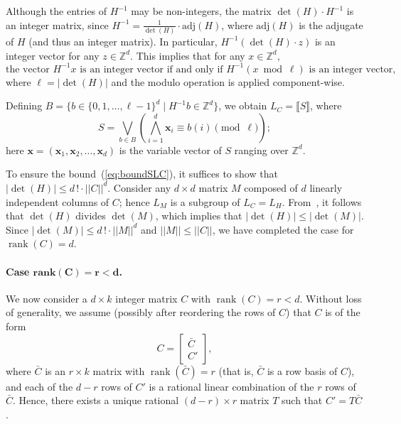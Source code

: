 \documentclass[11pt,a4paper]{amsart}
\newcommand{\adj}{\text{adj}}
\newcommand{\bvar}[1]{\mathbf{#1}}
\newcommand{\nnorm}[1]{||#1||}
\newcommand{\Zset}{\mathbb{Z}}
\newcommand{\setZ}{\Zset}
\newcommand{\rank}[1]{\operatorname{rank}(#1)}
\newcommand{\sem}[1]{\llbracket#1\rrbracket}
\theoremstyle{plain}
\theoremstyle{definition}
\theoremstyle{defC}
\theoremstyle{thmC}
\begin{document}
Although the entries of $H^{-1}$ may be non-integers, the matrix
$\det(H) \cdot H^{-1}$ is an integer matrix, since $H^{-1} =
\frac{1}{\det(H)}\cdot \adj(H)$, where $\adj(H)$ is the adjugate of
$H$ (and thus an integer matrix). In particular, $H^{-1}(\det(H) \cdot
z)$ is an integer vector for any $z \in \setZ^d$. This implies that
for any $x \in \setZ^d$, 
\[
	\text{the vector } H^{-1}x \text{ is an integer vector if and
	only if } H^{-1}(x \bmod \ell) \text{ is an integer vector,}
\]
where $\ell = |\det(H)|$ and the modulo operation is applied component-wise.


Defining $B = \{b \in \{0, 1, \dots, \ell{-}1\}^d \mid H^{-1}b \in \mathbb{Z}^d\}$, we obtain $L_C = \sem{S}$, where 
\[
    S = \bigvee_{b \in B} \left( \bigwedge_{i=1}^d \bvar{x}_i \equiv
    b(i) \!\!\!\! \pmod \ell \right);
\]
here $\bvar{x} = (\bvar{x}_1,\bvar{x}_2, \dots, \bvar{x}_d)$ is the
variable vector of $S$ ranging over $\setZ^d$.

To ensure the bound~(\ref{eq:boundSLC}),
it suffices to show that $|\det(H)|\leq d\,!\cdot\nnorm{C}^d$.
Consider any $d\times d$ matrix $M$ composed of $d$
linearly independent columns of $C$; hence $L_M$ is a subgroup of
$L_C=L_H$.
From~\cite[Chapter 4]{schrijver1986theory}, it follows that $\det(H)$
divides $\det(M)$, which implies that $|\det(H)|\leq |\det(M)|$.
Since $|\det(M)|\leq d\,!\cdot\nnorm{M}^d$ and
$\nnorm{M}\leq \nnorm{C}$, we have completed the case for
$\rank{C}=d$.

\paragraph{Case $\bm{\text{rank}(C)=r<d}$.}
We now consider a $d \times k$ integer matrix $C$ with $\rank{C} = r < d$. Without loss of generality, we assume (possibly after reordering the rows of $C$) that $C$ is of the form
\[
	C = \begin{bmatrix} \bar{C} \\ C' \end{bmatrix},
\]
where $\bar{C}$ is an $r \times k$ matrix with $\rank{\bar{C}} = r$
(that is, $\bar{C}$ is a row basis of $C$), and each of the $d-r$ rows
of $C'$ is a rational linear combination of the $r$ rows of $\bar{C}$.
Hence, there exists a unique rational $(d-r) \times r$ matrix $T$ such
that $C' = T\bar{C}$.
\end{document}
